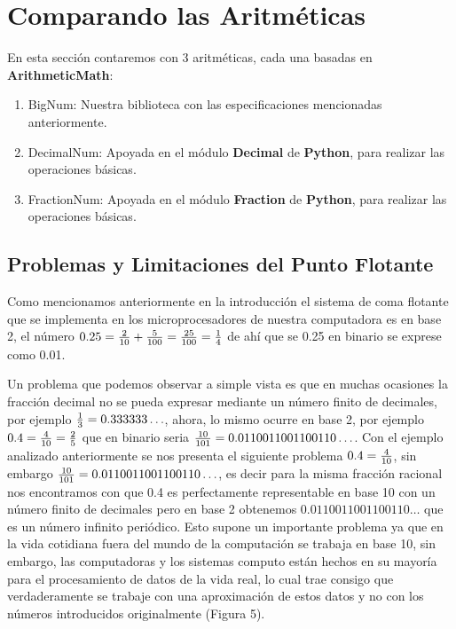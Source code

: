 \documentclass[a4paper,10pt,twocolumn]{article}
\begin{document}
\section{Comparando las Aritméticas}\label{sub:comp_aritmetics}
En esta sección contaremos con 3 aritméticas, cada una basadas en \textbf{ArithmeticMath}:
\begin{enumerate}
	\item BigNum: Nuestra biblioteca con las especificaciones mencionadas anteriormente.
	      
	\item DecimalNum: Apoyada en el módulo \textbf{Decimal} de \textbf{Python}, para realizar las operaciones básicas.
	      
	\item FractionNum: Apoyada en el módulo \textbf{Fraction} de \textbf{Python}, para realizar las operaciones básicas.
\end{enumerate}


\subsection{Problemas y Limitaciones del Punto Flotante}\label{sub:problems_limitations}
Como mencionamos anteriormente en la introducción el sistema de coma flotante que se implementa en los microprocesadores de nuestra computadora es en base 2, el número $0.25={2\over 10}+{5\over 100}={25\over 100}={1\over 4}$ de ahí que se 0.25 en binario se exprese como 0.01. 

Un problema que podemos observar a simple vista es que en muchas ocasiones la fracción decimal no se pueda expresar mediante un número finito de decimales, por ejemplo ${1\over 3}=0.333333\ldots$, ahora, lo mismo ocurre en base 2, por ejemplo $0.4={4\over 10}={2\over 5}$ que en binario seria ${10\over 101}=0.0110011001100110\ldots$. Con el ejemplo analizado anteriormente se nos presenta el siguiente problema $0.4={4\over 10}$, sin embargo ${10\over 101}=0.0110011001100110\ldots$, es decir para la misma fracción racional nos encontramos con que 0.4 es perfectamente representable en base 10 con un número finito de decimales pero en base 2 obtenemos $0.0110011001100110\ldots$ que es un número infinito periódico. Esto supone un importante problema ya que en la vida cotidiana fuera del mundo de la computación se trabaja en base 10, sin embargo, las computadoras y los sistemas computo están hechos en su mayoría para el procesamiento de datos de la vida real, lo cual trae consigo que verdaderamente se trabaje con una aproximación de estos datos y no con los números introducidos originalmente (Figura 5).
\end{document}
